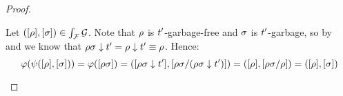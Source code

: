 \begin{proof}
\begin{enumerate}
\begin{enumerate}
    Let $({[\rho]},{[\sigma]}) \in \int_{\mathcal{F}}{\mathcal{G}}$.
    Note that
    $\rho$ is $t'$-garbage-free
    and $\sigma$ is $t'$-garbage,
    so by~
    and 
    we know that $\rho\sigma \downarrow t' = \rho \downarrow t' \equiv \rho$.
    Hence:
    \[
      \varphi(\psi({[\rho]},{[\sigma]}))
      = \varphi({[\rho\sigma]})
      = ({[\rho\sigma \downarrow t']}, {[\rho\sigma/(\rho\sigma \downarrow t')]})
      = ({[\rho]}, {[\rho\sigma/\rho]})
      = ({[\rho]}, {[\sigma]})
    \]
  \end{enumerate}
\end{enumerate}
\end{proof}
